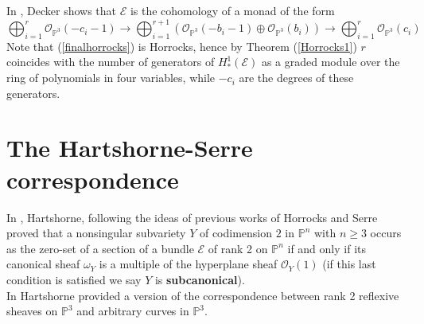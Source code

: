 \documentclass[
	oldfontcommands,
	sumario=abnt-6027-2012,
	12pt,			%
	openright,		%
	oneside,		%
	a4paper,		%
	english,		%
	brazil			%
	]{imecc-unicamp}
\begin{document}
\fi
In \cite[Decker, Proposition 1]{Decker1990}, Decker shows that $\mathcal{E}$ is the cohomology of a monad of the form
\begin{equation}\label{finalhorrocks}
\bigoplus_{i=1}^{r} \mathcal{O}_{\mathbb{P}^3}(-c_i-1) \to \bigoplus_{i=1}^{r+1} (\mathcal{O}_{\mathbb{P}^3}(-b_i-1) \oplus \mathcal{O}_{\mathbb{P}^3}(b_i)) \to \bigoplus_{i=1}^{r} \mathcal{O}_{\mathbb{P}^3}(c_i)
\end{equation}
Note that (\ref{finalhorrocks}) is Horrocks, hence by Theorem (\ref{Horrocks1}) $r$ coincides with the number of generators of $H^1_* (\mathcal{E})$ as a graded module over the ring of polynomials in four variables, while $-c_i$ are the degrees of these generators.
\section{The Hartshorne-Serre correspondence}
In \cite[Hartshorne]{hartshorne1974}, Hartshorne, following the ideas of previous works of Horrocks \cite[Horrocks, 1968]{HORROCKS1968117} and Serre \cite[Serre, 1960]{serre_2003} proved that a nonsingular subvariety $Y$ of codimension $2$ in $\mathbb{P}^n$ with $n \geq 3$ occurs as the zero-set of a section of a bundle $\mathcal{E}$ of rank 2 on $\mathbb{P}^n$ if and only if its canonical sheaf $\omega_Y$ is a multiple of the hyperplane sheaf $\mathcal{O}_Y(1)$ (if this last condition is satisfied we say $Y$ is \textbf{subcanonical}). \\
In \cite[Hartshorne]{Hartshorne1980} Hartshorne provided a version of the correspondence between rank 2 reflexive sheaves on $\mathbb{P}^3$ and arbitrary curves in $\mathbb{P}^3$.
\end{document}
